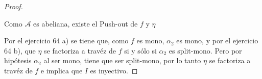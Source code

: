 \documentclass{article}
\begin{document}
\begin{enumerate}[label=\textbf{Ej \arabic*.}]
\begin{proof}
\centerline{
}

Como  $\mathscr{A}$ es abeliana, existe el Push-out de $f$ y $\eta$\\


\centerline{
}

Por el ejercicio 64 a) se tiene que, como $f$ es mono, $\alpha_2$ es mono, y por el ejercicio 64 b), que $\eta$ se factoriza a travéz de $f$ si y sólo si
$\alpha_2$ es split-mono. Pero por hipótesis $\alpha_2$ al ser mono, tiene que ser split-mono, por lo tanto $\eta$ se factoriza a travéz de $f$ 
e implica que $I$ es inyectivo.

\end{proof}










\end{enumerate}
\end{document}
